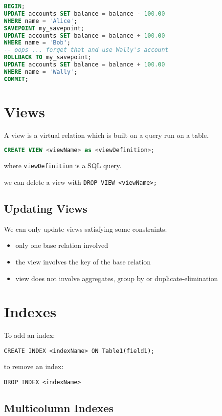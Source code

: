 \documentclass{sciposter}
\renewcommand{\t}[1]{\texttt{#1}}
\begin{document}
\begin{multicols}{3}
\begin{lstlisting}[language=SQL]
BEGIN;
UPDATE accounts SET balance = balance - 100.00
WHERE name = 'Alice';
SAVEPOINT my_savepoint;
UPDATE accounts SET balance = balance + 100.00
WHERE name = 'Bob';
-- oops ... forget that and use Wally's account
ROLLBACK TO my_savepoint;
UPDATE accounts SET balance = balance + 100.00
WHERE name = 'Wally';
COMMIT;

\end{lstlisting}


\section*{Views}

A view is a virtual relation which is built on a query run on a table. 
\begin{lstlisting}[language=SQL]
CREATE VIEW <viewName> as <viewDefinition>;
\end{lstlisting}
where \t{viewDefinition} is a SQL query.

we can delete a view with \t{DROP VIEW <viewName>;}

\subsection*{Updating Views}

We can only update views satisfying some constraints:
\begin{itemize}
	\item only one base relation involved
	\item the view involves the key of the base relation
	\item view does not involve aggregates, group by or duplicate-elimination
\end{itemize}


\section*{Indexes}

To add an index:

\t{CREATE INDEX <indexName> ON Table1(field1);}

to remove an index:

\t{DROP INDEX <indexName>}

\subsection*{Multicolumn Indexes}


\end{multicols}
\end{document}
